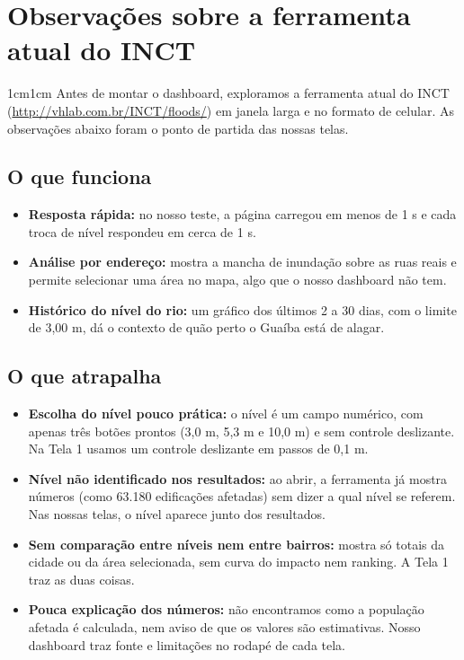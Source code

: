 \documentclass[12pt,a4paper]{article}
\newcommand{\paragrafo}[1]{%
    \begin{adjustwidth}{1cm}{1cm}
        \indent\indent #1
    \end{adjustwidth}
}
\begin{document}
\section{Observações sobre a ferramenta atual do INCT}
    \paragrafo{Antes de montar o dashboard, exploramos a ferramenta atual do INCT (\url{http://vhlab.com.br/INCT/floods/}) em janela larga e no formato de celular. As observações abaixo foram o ponto de partida das nossas telas.}
    \subsection{O que funciona}
        \begin{itemize}
            \item \textbf{Resposta rápida:} no nosso teste, a página carregou em menos de 1 s e cada troca de nível respondeu em cerca de 1 s.
            \item \textbf{Análise por endereço:} mostra a mancha de inundação sobre as ruas reais e permite selecionar uma área no mapa, algo que o nosso dashboard não tem.
            \item \textbf{Histórico do nível do rio:} um gráfico dos últimos 2 a 30 dias, com o limite de 3,00 m, dá o contexto de quão perto o Guaíba está de alagar.
        \end{itemize}
    \subsection{O que atrapalha}
        \begin{itemize}
            \item \textbf{Escolha do nível pouco prática:} o nível é um campo numérico, com apenas três botões prontos (3,0 m, 5,3 m e 10,0 m) e sem controle deslizante. Na Tela 1 usamos um controle deslizante em passos de 0,1 m.
            \item \textbf{Nível não identificado nos resultados:} ao abrir, a ferramenta já mostra números (como 63.180 edificações afetadas) sem dizer a qual nível se referem. Nas nossas telas, o nível aparece junto dos resultados.
            \item \textbf{Sem comparação entre níveis nem entre bairros:} mostra só totais da cidade ou da área selecionada, sem curva do impacto nem ranking. A Tela 1 traz as duas coisas.
            \item \textbf{Pouca explicação dos números:} não encontramos como a população afetada é calculada, nem aviso de que os valores são estimativas. Nosso dashboard traz fonte e limitações no rodapé de cada tela.
        \end{itemize}
\end{document}
